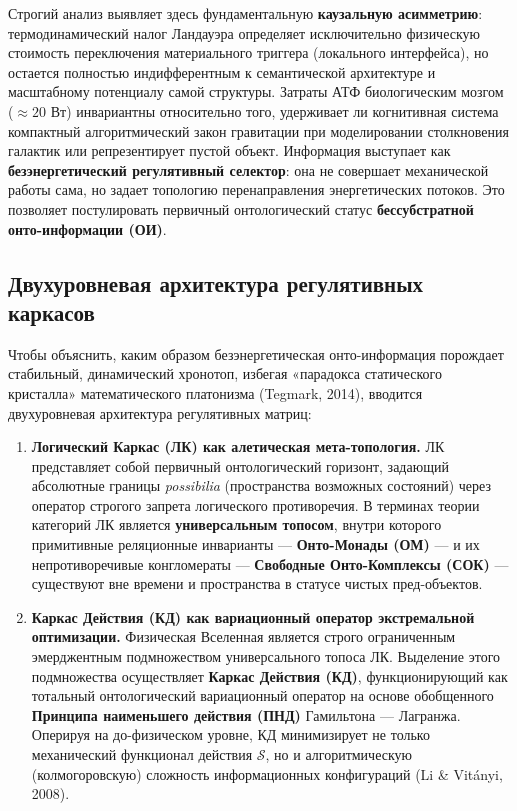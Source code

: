 \documentclass[12pt,a4paper]{article}
\begin{document}
Строгий анализ выявляет здесь фундаментальную \textbf{каузальную асимметрию}: термодинамический налог Ландауэра определяет исключительно физическую стоимость переключения материального триггера (локального интерфейса), но остается полностью индифферентным к семантической архитектуре и масштабному потенциалу самой структуры. Затраты АТФ биологическим мозгом ($\approx 20\text{ Вт}$) инвариантны относительно того, удерживает ли когнитивная система компактный алгоритмический закон гравитации при моделировании столкновения галактик или репрезентирует пустой объект. Информация выступает как \textbf{безэнергетический регулятивный селектор}: она не совершает механической работы сама, но задает топологию перенаправления энергетических потоков. Это позволяет постулировать первичный онтологический статус \textbf{бессубстратной онто-информации (ОИ)}.

\subsection{Двухуровневая архитектура регулятивных каркасов}
Чтобы объяснить, каким образом безэнергетическая онто-информация порождает стабильный, динамический хронотоп, избегая «парадокса статического кристалла» математического платонизма (Tegmark, 2014), вводится двухуровневая архитектура регулятивных матриц:
\begin{enumerate}
    \item \textbf{Логический Каркас (ЛК) как алетическая мета-топология.} ЛК представляет собой первичный онтологический горизонт, задающий абсолютные границы \textit{possibilia} (пространства возможных состояний) через оператор строгого запрета логического противоречия. В терминах теории категорий ЛК является \textbf{универсальным топосом}, внутри которого примитивные реляционные инварианты --- \textbf{Онто-Монады (ОМ)} --- и их непротиворечивые конгломераты --- \textbf{Свободные Онто-Комплексы (СОК)} --- существуют вне времени и пространства в статусе чистых пред-объектов.
    \item \textbf{Каркас Действия (КД) как вариационный оператор экстремальной оптимизации.} Физическая Вселенная является строго ограниченным эмерджентным подмножеством универсального топоса ЛК. Выделение этого подмножества осуществляет \textbf{Каркас Действия (КД)}, функционирующий как тотальный онтологический вариационный оператор на основе обобщенного \textbf{Принципа наименьшего действия (ПНД)} Гамильтона --- Лагранжа. Оперируя на до-физическом уровне, КД минимизирует не только механический функционал действия $\mathcal{S}$, но и алгоритмическую (колмогоровскую) сложность информационных конфигураций (Li \& Vitányi, 2008).
\end{enumerate}
\end{document}
